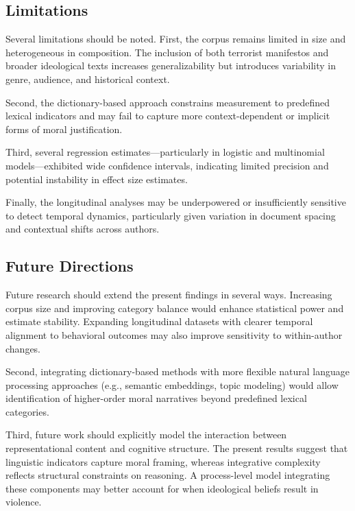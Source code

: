 \documentclass[
  english,
  man,floatsintext]{apa6}
\begin{document}
\subsection{Limitations}\label{limitations}

Several limitations should be noted. First, the corpus remains limited in size and heterogeneous in composition. The inclusion of both terrorist manifestos and broader ideological texts increases generalizability but introduces variability in genre, audience, and historical context.

Second, the dictionary-based approach constrains measurement to predefined lexical indicators and may fail to capture more context-dependent or implicit forms of moral justification.

Third, several regression estimates---particularly in logistic and multinomial models---exhibited wide confidence intervals, indicating limited precision and potential instability in effect size estimates.

Finally, the longitudinal analyses may be underpowered or insufficiently sensitive to detect temporal dynamics, particularly given variation in document spacing and contextual shifts across authors.

\subsection{Future Directions}\label{future-directions}

Future research should extend the present findings in several ways. Increasing corpus size and improving category balance would enhance statistical power and estimate stability. Expanding longitudinal datasets with clearer temporal alignment to behavioral outcomes may also improve sensitivity to within-author changes.

Second, integrating dictionary-based methods with more flexible natural language processing approaches (e.g., semantic embeddings, topic modeling) would allow identification of higher-order moral narratives beyond predefined lexical categories.

Third, future work should explicitly model the interaction between representational content and cognitive structure. The present results suggest that linguistic indicators capture moral framing, whereas integrative complexity reflects structural constraints on reasoning. A process-level model integrating these components may better account for when ideological beliefs result in violence.
\end{document}
